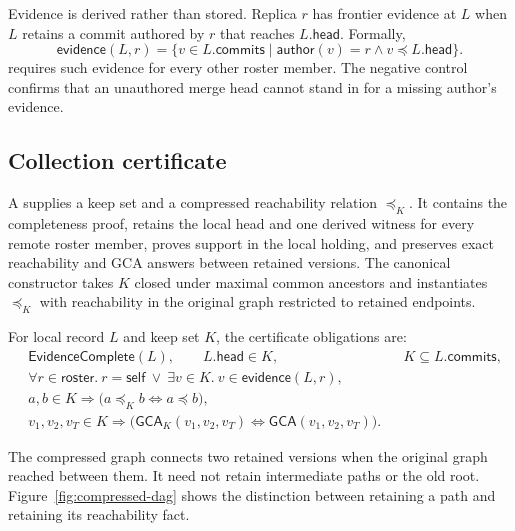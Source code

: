 Evidence is derived rather than stored. Replica $r$ has frontier evidence at
$L$ when $L$ retains a commit authored by $r$ that reaches $L.\mathsf{head}$.
Formally,
\[
 \mathsf{evidence}(L,r)=
 \{v\in L.\mathsf{commits}\mid
   \mathsf{author}(v)=r\land v\preceq L.\mathsf{head}\}.
\]
 requires such evidence for every other roster
member. The negative control  confirms
that an unauthored merge head cannot stand in for a missing author's evidence.

\subsection{Collection certificate}

A  supplies a keep set and a compressed reachability
relation $\preceq_K$. It contains the completeness proof, retains the local
head and one derived witness for every remote roster member, proves support in
the local holding, and preserves exact reachability and GCA answers between
retained versions. The canonical constructor
 takes $K$ closed under maximal common
ancestors and instantiates $\preceq_K$ with reachability in the original graph
restricted to retained endpoints.

For local record $L$ and keep set $K$, the certificate obligations are:
\begin{align*}
 &\mathsf{EvidenceComplete}(L),\qquad L.\mathsf{head}\in K,
 &&K\subseteq L.\mathsf{commits},\\
 &\forall r\in\mathsf{roster}.\ r=\mathsf{self}\ \lor\
   \exists v\in K.\ v\in\mathsf{evidence}(L,r),\\
 &a,b\in K\Rightarrow
   \bigl(a\preceq_K b\Longleftrightarrow a\preceq b\bigr),\\
 &v_1,v_2,v_T\in K\Rightarrow
   \bigl(\mathsf{GCA}_K(v_1,v_2,v_T)\Longleftrightarrow
         \mathsf{GCA}(v_1,v_2,v_T)\bigr).
\end{align*}

The compressed graph connects two retained versions when the original graph
reached between them. It need not retain intermediate paths or the old root.
Figure~\ref{fig:compressed-dag} shows the distinction between retaining a path
and retaining its reachability fact.

